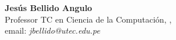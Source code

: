 \noindent \textbf{Jesús Bellido Angulo}\\ 
Professor TC en Ciencia de la Computación, \University, \city\\
email: \textit{jbellido@utec.edu.pe}\\

